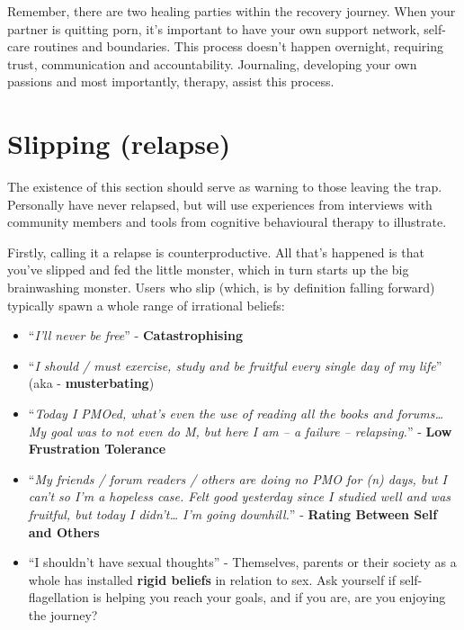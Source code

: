 \documentclass[
]{book}
\providecommand{\tightlist}{%
  \setlength{\itemsep}{0pt}\setlength{\parskip}{0pt}}
\begin{document}
Remember, there are two healing parties within the recovery journey. When your partner is quitting porn, it's important to have your own support network, self-care routines and boundaries. This process doesn't happen overnight, requiring trust, communication and accountability. Journaling, developing your own passions and most importantly, therapy, assist this process.

\hypertarget{slipping-relapse}{%
\section{Slipping (relapse)}\label{slipping-relapse}}

The existence of this section should serve as warning to those leaving the trap. Personally have never relapsed, but will use experiences from interviews with community members and tools from cognitive behavioural therapy to illustrate.

Firstly, calling it a relapse is counterproductive. All that's happened is that you've slipped and fed the little monster, which in turn starts up the big brainwashing monster. Users who slip (which, is by definition falling forward) typically spawn a whole range of irrational beliefs:

\begin{itemize}
\tightlist
\item
  ``\emph{I'll never be free}'' - \textbf{Catastrophising}
\item
  ``\emph{I should / must exercise, study and be fruitful every single day of my life}'' (aka - \textbf{musterbating})
\item
  ``\emph{Today I PMOed, what's even the use of reading all the books and forums\ldots{} My goal was to not even do M, but here I am -- a failure -- relapsing.}'' - \textbf{Low Frustration Tolerance}
\item
  ``\emph{My friends / forum readers / others are doing no PMO for (n) days, but I can't so I'm a hopeless case. Felt good yesterday since I studied well and was fruitful, but today I didn't\ldots{} I'm going downhill.}'' - \textbf{Rating Between Self and Others}
\item
  ``I shouldn't have sexual thoughts'' - Themselves, parents or their society as a whole has installed \textbf{rigid beliefs} in relation to sex. Ask yourself if self-flagellation is helping you reach your goals, and if you are, are you enjoying the journey?
\end{itemize}
\end{document}
